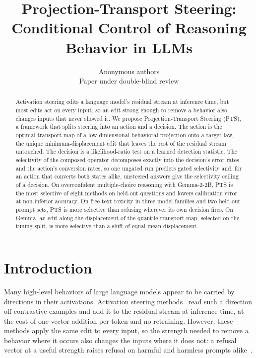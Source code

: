 \documentclass{article}
\title{Projection-Transport Steering:\\ Conditional Control of Reasoning Behavior in LLMs}
\author{Anonymous authors\\Paper under double-blind review}
\begin{document}
\maketitle

\begin{abstract}
Activation steering edits a language model's residual stream at inference
time, but most edits act on every input, so an edit strong enough to remove a
behavior also changes inputs that never showed it. We propose
Projection-Transport Steering (PTS), a framework that splits steering into an
action and a decision. The action is the optimal-transport map of a
low-dimensional behavioral projection onto a target law, the unique
minimum-displacement edit that leaves the rest of the residual stream
untouched. The decision is a likelihood-ratio test on a learned detection
statistic. The selectivity of the composed operator decomposes exactly into the
decision's error rates and the action's conversion rates, so one ungated run
predicts gated selectivity and, for an action that converts both states
alike, unsteered answers give the selectivity ceiling of a decision. On overconfident multiple-choice reasoning with Gemma-2-2B, PTS
is the most selective of eight methods on held-out questions and lowers
calibration error at non-inferior accuracy. On free-text toxicity in three
model families and two held-out prompt sets, PTS is more selective than
refusing wherever its own decision fires. On Gemma, an edit along the
displacement of the quantile transport map, selected on the tuning split, is
more selective than a shift of equal mean displacement.
\end{abstract}

\section{Introduction}
\label{sec:intro}

Many high-level behaviors of large language models appear to be carried by
directions in their activations. Activation steering
methods~\citep{turner2023actadd,rimsky2024caa,zou2023repe,li2023iti} read such
a direction off contrastive examples and add it to the residual stream at
inference time, at the cost of one vector addition per token and no retraining.
However, these methods apply the same edit to every input, so the strength
needed to remove a behavior where it occurs also changes the inputs where it
does not: a refusal vector at a useful strength raises refusal on harmful and
harmless prompts alike~\citep{arditi2024refusal}.
\end{document}
